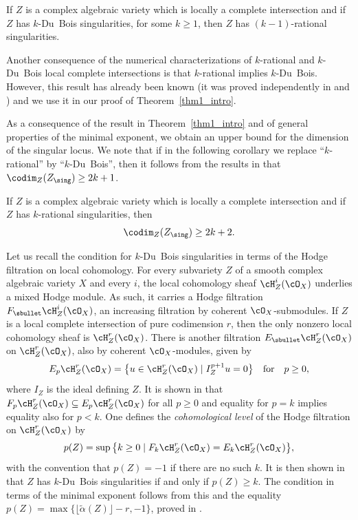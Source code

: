 \begin{cor}\label{cor2_intro}
If $Z$ is a complex algebraic variety which is locally a complete intersection and if $Z$ has $k$-Du~Bois singularities, for some $k\geq 1$,
then $Z$ has $(k-1)$-rational singularities.
\end{cor}

Another consequence of the numerical characterizations of $k$-rational and $k$-Du~Bois local complete intersections
is that $k$-rational implies $k$-Du~Bois. However, this result has already been known (it was proved independently in \cite{FL2} and \cite{MP1})
and we use it in our proof of Theorem~\ref{thm1_intro}.

As a consequence of the result in Theorem~\ref{thm1_intro} and of general properties
of the minimal exponent, we obtain an upper bound for the dimension of the singular locus.
We note that if in the following corollary we replace ``$k$-rational'' by ``$k$-Du~Bois'', then it follows from the results in \cite{MP1}
that $\codim_Z(Z_\sing)\geq 2k+1$.

\begin{cor}\label{cor2.5_intro}
If $Z$ is a complex algebraic variety which is locally a complete intersection and if $Z$ has $k$-rational singularities, then
\[\codim_Z(Z_\sing)\geq 2k+2.\]
\end{cor}

Let us recall the condition for $k$-Du~Bois singularities in terms of the Hodge filtration on local cohomology. For every subvariety $Z$
of a smooth complex algebraic variety $X$ and every $i$, the local cohomology sheaf $\cH^i_Z(\cO_X)$ underlies a mixed Hodge module. As such, it carries a
Hodge filtration $F_{\sbullet}\cH^i_Z(\cO_X)$, an increasing filtration by coherent $\cO_X$-submodules. If $Z$ is a local complete intersection of pure codimension $r$,
then the only nonzero local cohomology sheaf is $\cH^r_Z(\cO_X)$. There is another filtration $E_{\sbullet}\cH^r_Z(\cO_X)$ on $\cH^r_Z(\cO_X)$,
also by coherent $\cO_X$-modules,
given by
\[E_p\cH^r_Z(\cO_X)=\big\{u\in \cH^r_Z(\cO_X)\mid I_Z^{p+1}u=0\big\}\quad\text{for}\quad p\geq 0,\]
where $I_Z$ is the ideal defining $Z$. It is shown in \cite{MP1} that $F_p\cH^r_Z(\cO_X)\subseteq E_p\cH^r_Z(\cO_X)$ for all $p\geq 0$
and equality for $p=k$ implies equality also for $p<k$.
One defines the \emph{cohomological level} of the Hodge filtration on $\cH^r_Z(\cO_X)$ by
\[p(Z)=\sup\big\{k\geq 0\mid F_k\cH^r_Z(\cO_X)=E_k\cH^r_Z(\cO_X)\big\},\]
with the convention that $p(Z)=-1$ if there are no such $k$. It is then shown in \cite{MP1} that $Z$ has $k$-Du~Bois singularities
if and only if $p(Z)\geq k$. The condition in terms of the minimal exponent follows from this and the equality
$p(Z)=\max\big\{\lfloor\widetilde{\alpha}(Z)\rfloor-r, -1\big\}$, proved in \cite{CDMO}.

